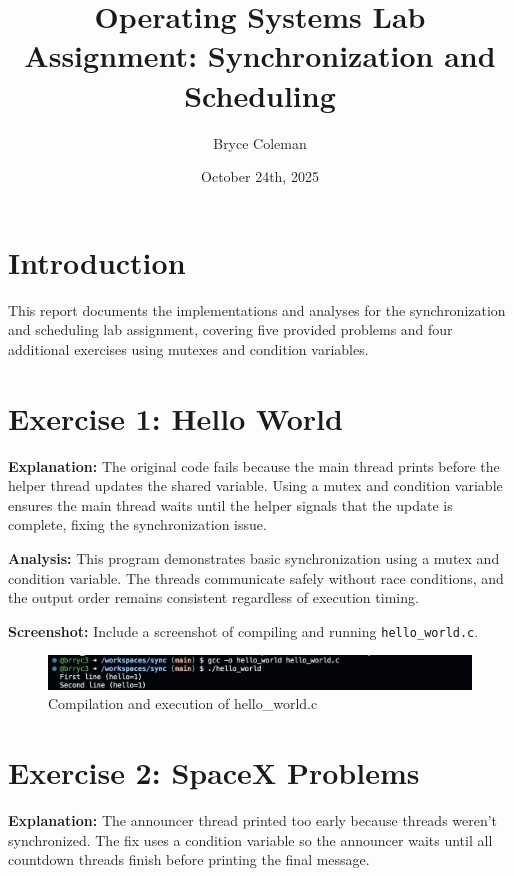 \documentclass{article}
\begin{document}
\title{Operating Systems Lab Assignment: Synchronization and Scheduling}
\author{Bryce Coleman}
\date{October 24th, 2025}
\maketitle

\section{Introduction}
This report documents the implementations and analyses for the synchronization and scheduling lab assignment, covering five provided problems and four additional exercises using mutexes and condition variables.

\section{Exercise 1: Hello World}


\textbf{Explanation:} The original code fails because the main thread prints before the helper thread updates the shared variable. Using a mutex and condition variable ensures the main thread waits until the helper signals that the update is complete, fixing the synchronization issue.

\textbf{Analysis:} This program demonstrates basic synchronization using a mutex and condition variable. The threads communicate safely without race conditions, and the output order remains consistent regardless of execution timing.

\textbf{Screenshot:} Include a screenshot of compiling and running \texttt{hello\_world.c}.
\begin{figure}[h]
\centering
\includegraphics[width=\textwidth]{exercise1_screenshot.png}
\caption{Compilation and execution of hello\_world.c}
\end{figure}

\section{Exercise 2: SpaceX Problems}


\textbf{Explanation:} The announcer thread printed too early because threads weren’t synchronized. The fix uses a condition variable so the announcer waits until all countdown threads finish before printing the final message.
\end{document}
